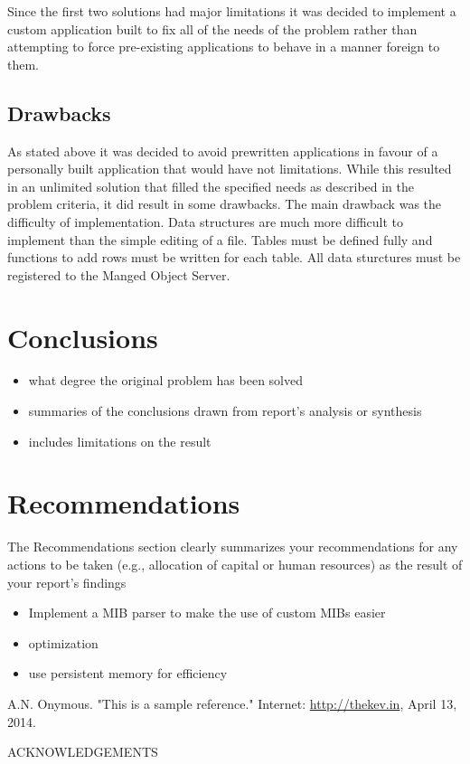 \documentclass[12pt]{article}
\begin{document}
Since the first two solutions had major limitations it was decided to implement a custom application built to fix all of the needs of the problem rather than attempting to force pre-existing applications to behave in a manner foreign to them. 
\subsection{Drawbacks}
As stated above it was decided to avoid prewritten applications in favour of a personally built application that would have not limitations. While this resulted in an unlimited solution that filled the specified needs as described in the problem criteria, it did result in some drawbacks. The main drawback was the difficulty of implementation. Data structures are much more difficult to implement than the simple editing of a file. Tables must be defined fully and functions to add rows must be written for each table. All data sturctures must be registered to the Manged Object Server.

\section{Conclusions}



\begin{itemize}
	\item what degree the original problem has been solved
	\item summaries of the conclusions drawn from report's analysis or synthesis
	\item includes limitations on the result
\end{itemize}
\section{Recommendations}
The Recommendations section clearly summarizes your recommendations for any actions to be taken (e.g., allocation of capital or human resources) as the result of your report's findings
\begin{itemize}
	\item Implement a MIB parser to make the use of custom MIBs easier
	\item optimization
	\item use persistent memory for efficiency
\end{itemize}


\newpage
{}
\begin{thebibliography}{9}
		A.N. Onymous. "This is a sample reference." Internet: \url{http://thekev.in}, April 13, 2014.
\end{thebibliography}
\newpage


ACKNOWLEDGEMENTS
\newpage


\end{document}
